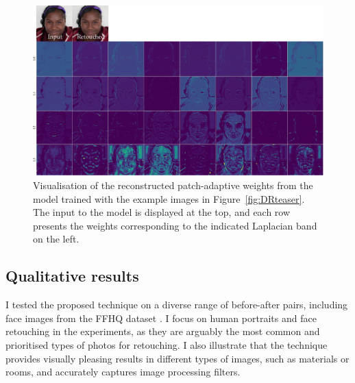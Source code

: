 \begin{figure}%
\centering
\includegraphics[width=\columnwidth]{Chapters/detail-retouching-figs/weight_visualise.pdf}
    \caption{Visualisation of the reconstructed patch-adaptive weights from the model trained with the example images in Figure~\ref{fig:DRteaser}. The input to the model is displayed at the top, and each row presents the weights corresponding to the indicated Laplacian band on the left.}

\label{fig:weight-vis}
\end{figure}

\subsection{Qualitative results}
 I tested the proposed technique on a diverse range of before-after pairs, including face images from the FFHQ dataset \cite{karras2019style}. I focus on human portraits and face retouching in the experiments, as they are arguably the most common and prioritised types of photos for retouching. I also illustrate that the technique provides visually pleasing results in different types of images, such as materials or rooms, and accurately captures image processing filters.
 
